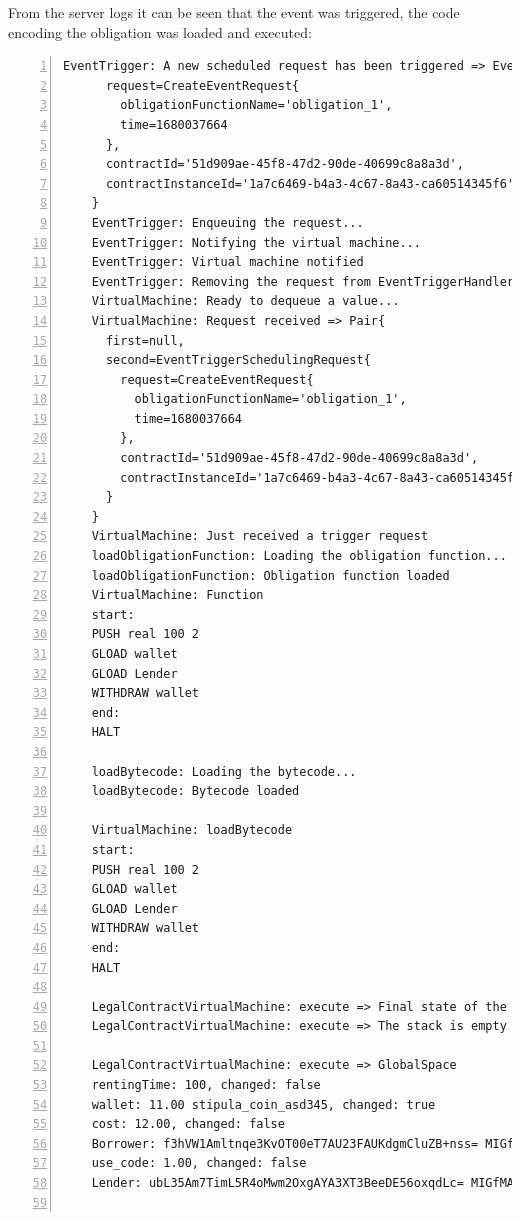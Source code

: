 From the server logs it can be seen that the event was triggered, the code encoding the obligation was 
loaded and executed:
{
  \small
  \begin{Verbatim}[numbers=left,xleftmargin=1cm,firstnumber=1,breaklines=true,breakanywhere=true,tabsize=2]
    EventTrigger: A new scheduled request has been triggered => EventTriggerSchedulingRequest{
      request=CreateEventRequest{
        obligationFunctionName='obligation_1', 
        time=1680037664
      }, 
      contractId='51d909ae-45f8-47d2-90de-40699c8a8a3d', 
      contractInstanceId='1a7c6469-b4a3-4c67-8a43-ca60514345f6'
    }
    EventTrigger: Enqueuing the request...
    EventTrigger: Notifying the virtual machine...
    EventTrigger: Virtual machine notified
    EventTrigger: Removing the request from EventTriggerHandler...
    VirtualMachine: Ready to dequeue a value...
    VirtualMachine: Request received => Pair{
      first=null, 
      second=EventTriggerSchedulingRequest{
        request=CreateEventRequest{
          obligationFunctionName='obligation_1', 
          time=1680037664
        }, 
        contractId='51d909ae-45f8-47d2-90de-40699c8a8a3d', 
        contractInstanceId='1a7c6469-b4a3-4c67-8a43-ca60514345f6'
      }
    }
    VirtualMachine: Just received a trigger request
    loadObligationFunction: Loading the obligation function...
    loadObligationFunction: Obligation function loaded
    VirtualMachine: Function
    start:
    PUSH real 100 2
    GLOAD wallet
    GLOAD Lender
    WITHDRAW wallet
    end:
    HALT
  
    loadBytecode: Loading the bytecode...
    loadBytecode: Bytecode loaded
  
    VirtualMachine: loadBytecode
    start:
    PUSH real 100 2
    GLOAD wallet
    GLOAD Lender
    WITHDRAW wallet
    end:
    HALT
  
    LegalContractVirtualMachine: execute => Final state of the execution below
    LegalContractVirtualMachine: execute => The stack is empty
  
    LegalContractVirtualMachine: execute => GlobalSpace
    rentingTime: 100, changed: false
    wallet: 11.00 stipula_coin_asd345, changed: true
    cost: 12.00, changed: false
    Borrower: f3hVW1Amltnqe3KvOT00eT7AU23FAUKdgmCluZB+nss= MIGfMA0GCSqGSIb3DQEBAQUAA4GNADCBiQKBgQDErzzgD2ZslZxciFAiX3/ot7lrkZDw4148jFZrsDZPE6CVs9xXFSHGgy/mFvIFLXhnChO6Nyd2be3lbgeavLMCMVUiTStXr117Km17keWpb3sItkKKsLFBOcIIU8XXowI/OhzQN2XPZYESHgjdQ5vwEj2YyueiS7WKP94YWz/pswIDAQAB, changed: false
    use_code: 1.00, changed: false
    Lender: ubL35Am7TimL5R4oMwm2OxgAYA3XT3BeeDE56oxqdLc= MIGfMA0GCSqGSIb3DQEBAQUAA4GNADCBiQKBgQCo/GjVKS+3gAA55+kko41yINdOcCLQMSBQyuTTkKHE1mhu/TgOpivM0wLPsSga8hQMr3+v3aR0IF/vfCRf6SdiXmWx/jflmEXtnT6fkGcnV6dGNUpHWXSpwUIDt0N88jfnEqekx4S+KDCKg99sGEeHeT65fKS8lB0gjHMt9AOriwIDAQAB, changed: false
  

\end{Verbatim}}
